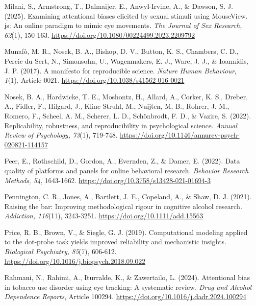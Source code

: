 \documentclass[authordate, empirical]{jote-new-article}
\begin{document}
	Milani, S., Armstrong, T., Dalmaijer, E., Anwyl-Irvine, A., \& Dawson, S. J. (2025). Examining attentional biases elicited by sexual stimuli using MouseView. js: An online paradigm to mimic eye movements. \emph{The Journal of Sex Research, 62}(1), 150-163. \url{https://doi.org/10.1080/00224499.2023.2209792}



	Munafò, M. R., Nosek, B. A., Bishop, D. V., Button, K. S., Chambers, C. D., Percie du Sert, N., Simonsohn, U., Wagenmakers, E. J., Ware, J. J., \& Ioannidis, J. P. (2017). A manifesto for reproducible science. \emph{Nature Human Behaviour, 1}(1), Article 0021. \url{https://doi.org/10.1038/s41562-016-0021}



	Nosek, B. A., Hardwicke, T. E., Moshontz, H., Allard, A., Corker, K. S., Dreber, A., Fidler, F., Hilgard, J., Kline Struhl, M., Nuijten, M. B., Rohrer, J. M., Romero, F., Scheel, A. M., Scherer, L. D., Schönbrodt, F. D., \& Vazire, S. (2022). Replicability, robustness, and reproducibility in psychological science. \emph{Annual Review of Psychology, 73}(1), 719-748. \url{https://doi.org/10.1146/annurev-psych-020821-114157}



	Peer, E., Rothschild, D., Gordon, A., Evernden, Z., \& Damer, E. (2022). Data quality of platforms and panels for online behavioral research. \emph{Behavior Research Methods, 54}, 1643-1662. \url{https://doi.org/10.3758/s13428-021-01694-3}



	Pennington, C. R., Jones, A., Bartlett, J. E., Copeland, A., \& Shaw, D. J. (2021). Raising the bar: Improving methodological rigour in cognitive alcohol research. \emph{Addiction, 116}(11), 3243-3251. \url{https://doi.org/10.1111/add.15563}



	Price, R. B., Brown, V., \& Siegle, G. J. (2019). Computational modeling applied to the dot-probe task yields improved reliability and mechanistic insights. \emph{Biological Psychiatry, 85}(7), 606-612. \url{https://doi.org/10.1016/j.biopsych.2018.09.022}



	Rahmani, N., Rahimi, A., Iturralde, K., \& Zawertailo, L. (2024). Attentional bias in tobacco use disorder using eye tracking: A systematic review. \emph{Drug and Alcohol Dependence Reports}, Article 100294. \url{https://doi.org/10.1016/j.dadr.2024.100294}
\end{document}
